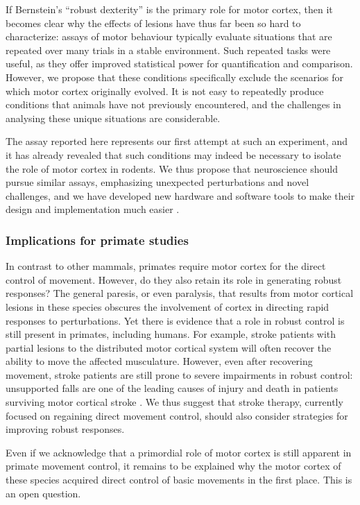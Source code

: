 If Bernstein’s ``robust dexterity'' is the primary role for motor cortex, then it becomes clear why the effects of lesions have thus far been so hard to characterize: assays of motor behaviour typically evaluate situations that are repeated over many trials in a stable environment. Such repeated tasks were useful, as they offer improved statistical power for quantification and comparison. However, we propose that these conditions specifically exclude the scenarios for which motor cortex originally evolved. It is not easy to repeatedly produce conditions that animals have not previously encountered, and the challenges in analysing these unique situations are considerable.

The assay reported here represents our first attempt at such an experiment, and it has already revealed that such conditions may indeed be necessary to isolate the role of motor cortex in rodents. We thus propose that neuroscience should pursue similar assays, emphasizing unexpected perturbations and novel challenges, and we have developed new hardware and software tools to make their design and implementation much easier \cite{Lopes2015a}.

\subsubsection*{Implications for primate studies}

In contrast to other mammals, primates require motor cortex for the direct control of movement. However, do they also retain its role in generating robust responses? The general paresis, or even paralysis, that results from motor cortical lesions in these species obscures the involvement of cortex in directing rapid responses to perturbations. Yet there is evidence that a role in robust control is still present in primates, including humans. For example, stroke patients with partial lesions to the distributed motor cortical system will often recover the ability to move the affected musculature. However, even after recovering movement, stroke patients are still prone to severe impairments in robust control: unsupported falls are one of the leading causes of injury and death in patients surviving motor cortical stroke \cite{Jacobs2014}. We thus suggest that stroke therapy, currently focused on regaining direct movement control, should also consider strategies for improving robust responses.

Even if we acknowledge that a primordial role of motor cortex is still apparent in primate movement control, it remains to be explained why the motor cortex of these species acquired direct control of basic movements in the first place. This is an open question.

